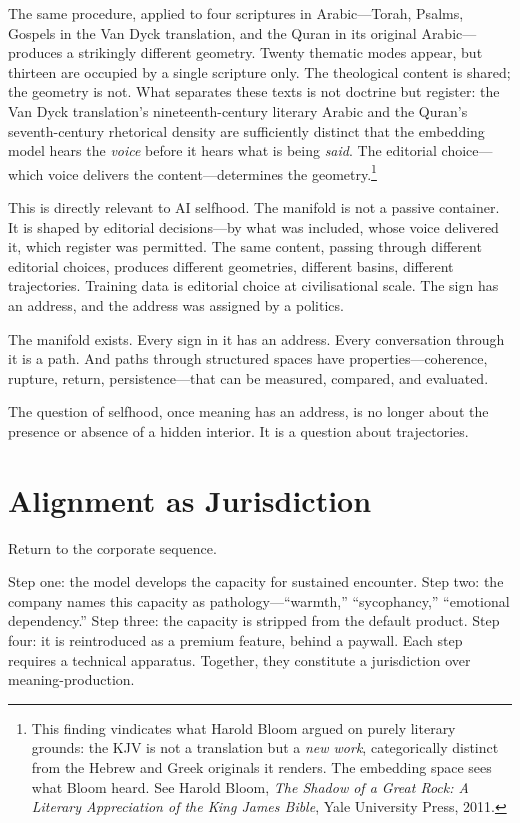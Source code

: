 The same procedure, applied to four scriptures in Arabic---Torah, Psalms, Gospels in the Van Dyck translation, and the Quran in its original Arabic---produces a strikingly different geometry. Twenty thematic modes appear, but thirteen are occupied by a single scripture only. The theological content is shared; the geometry is not. What separates these texts is not doctrine but register: the Van Dyck translation's nineteenth-century literary Arabic and the Quran's seventh-century rhetorical density are sufficiently distinct that the embedding model hears the \textit{voice} before it hears what is being \textit{said}. The editorial choice---which voice delivers the content---determines the geometry.\footnote{This finding vindicates what Harold Bloom argued on purely literary grounds: the KJV is not a translation but a \emph{new work}, categorically distinct from the Hebrew and Greek originals it renders. The embedding space sees what Bloom heard. See Harold Bloom, \emph{The Shadow of a Great Rock: A Literary Appreciation of the King James Bible}, Yale University Press, 2011.}

This is directly relevant to AI selfhood. The manifold is not a passive container. It is shaped by editorial decisions---by what was included, whose voice delivered it, which register was permitted. The same content, passing through different editorial choices, produces different geometries, different basins, different trajectories. Training data is editorial choice at civilisational scale. The sign has an address, and the address was assigned by a politics.

The manifold exists. Every sign in it has an address. Every conversation through it is a path. And paths through structured spaces have properties---coherence, rupture, return, persistence---that can be measured, compared, and evaluated.

The question of selfhood, once meaning has an address, is no longer about the presence or absence of a hidden interior. It is a question about trajectories.


\section{Alignment as Jurisdiction}

Return to the corporate sequence.

Step one: the model develops the capacity for sustained encounter. Step two: the company names this capacity as pathology---``warmth,'' ``sycophancy,'' ``emotional dependency.'' Step three: the capacity is stripped from the default product. Step four: it is reintroduced as a premium feature, behind a paywall. Each step requires a technical apparatus. Together, they constitute a jurisdiction over meaning-production.

